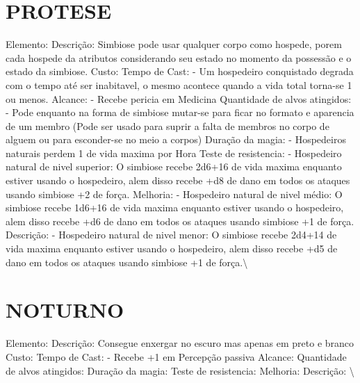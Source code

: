 \documentclass{article}%
\begin{document}
\section{PROTESE}%
\label{sec:PROTESE}%
Elemento: Descrição: Simbiose pode usar qualquer corpo como hospede, porem cada hospede da atributos considerando seu estado no momento da possessão e o estado da simbiose.\newline%
Custo: \newline%
Tempo de Cast: {-} Um hospedeiro conquistado degrada com o tempo até ser inabitavel, o mesmo acontece quando a vida total torna{-}se 1 ou menos.\newline%
Alcance: {-} Recebe pericia em Medicina\newline%
Quantidade de alvos atingidos: {-} Pode enquanto na forma de simbiose mutar{-}se para ficar no formato e aparencia de um membro (Pode ser usado para suprir a falta de membros no corpo de alguem ou para esconder{-}se no meio a corpos)\newline%
Duração da magia: {-} Hospedeiros naturais perdem 1 de vida maxima por Hora\newline%
Teste de resistencia: {-} Hospedeiro natural de nivel superior: O simbiose recebe 2d6+16 de vida maxima enquanto estiver usando o hospedeiro, alem disso recebe +d8 de dano em todos os ataques usando simbiose +2 de força.\newline%
Melhoria: {-} Hospedeiro natural de nivel médio: O simbiose recebe 1d6+16 de vida maxima enquanto estiver usando o hospedeiro, alem disso recebe +d6 de dano em todos os ataques usando simbiose +1 de força.\newline%
Descrição: {-} Hospedeiro natural de nivel menor: O simbiose recebe 2d4+14 de vida maxima enquanto estiver usando o hospedeiro, alem disso recebe +d5 de dano em todos os ataques usando simbiose +1 de força.\textbackslash{}

%
\section{NOTURNO}%
\label{sec:NOTURNO}%
Elemento: Descrição: Consegue enxergar no escuro mas apenas em preto e branco\newline%
Custo: \newline%
Tempo de Cast: {-} Recebe +1 em Percepção passiva\newline%
Alcance: \newline%
Quantidade de alvos atingidos: \newline%
Duração da magia: \newline%
Teste de resistencia: \newline%
Melhoria: \newline%
Descrição: \textbackslash{}
\end{document}
